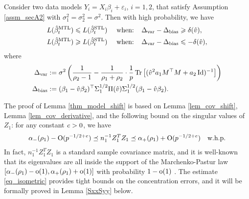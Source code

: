 \begin{lemma}%
\label{thm_model_shift}
Consider two data models $Y_i = X_i\beta_i + \varepsilon_i$, $i=1,2$, that satisfy Assumption \ref{assm_secA2} with $\sigma_1^2=\sigma_2^2=\sigma^2$. Then with high probability, we have
	\begin{align}
	 	L(\hat{\beta}_{t}^{\textup{MTL}}) \leqslant L(\hat{\beta}_t^{\textup{STL}}) \quad \text{ when: } \ \ &\Delta_{\text{var}} - \Delta_{\text{bias}} \geqslant   \delta(\hat v), \label{upper}\\
		L(\hat{\beta}_t^{\textup{MTL}}) \geqslant L(\hat{\beta}_t^{\textup{STL}}) \quad \text{ when: } \ \ &\Delta_{\text{var}} - \Delta_{\text{bias}} \leqslant - \delta(\hat v), \label{lower}
	\end{align}
	where
	\begin{align} %
		\Delta_{\vari} &\define {\sigma^2}\bigbrace{\frac{1}{\rho_2 - 1} -  \frac{1}{\rho_1 + \rho_2}\cdot \frac1p \bigtr{( \hat v^2 a_1 M^{\top}M +  a_2\id)^{-1}} } \label{Deltavarv} \\
		\Delta_{\bias} &\define (\beta_1 - \hat{v}\beta_2)^{\top} \Sigma_1^{1/2} \Pi (\hat v)\Sigma_1^{1/2} (\beta_1 - \hat{v}\beta_2). \label{Deltabetav}
	\end{align}
\end{lemma}

The proof of Lemma \ref{thm_model_shift} is based on Lemma \ref{lem_cov_shift}, Lemma \ref{lem_cov_derivative}, and the following bound on the singular values of $Z_1$: for any constant ${\mathit{c}}>0$, we have
\begin{align}
\alpha_-(\rho_1) - \operatorname{O}(p^{-1/2+e})  \preceq {n_1^{-1}}{Z_1^T Z_1}  \preceq   \alpha_+(\rho_1) + \operatorname{O}(p^{-1/2+e}) \quad \text{w.h.p.}  \label{eq_isometric}
\end{align}
In fact, $n_1^{-1}Z_1^TZ_1$ is a standard sample covariance matrix, and it is well-known that its eigenvalues are all inside the support of the Marchenko-Pastur law $[\alpha_-(\rho_1)-\operatorname{o}(1) ,\alpha_+(\rho_1)+\operatorname{o}(1)]$ with probability $1-\operatorname{o}(1)$ \cite{No_outside}. The estimate \eqref{eq_isometric} provides tight bounds on the concentration errors, and it will be formally proved in Lemma \ref{SxxSyy} below.

